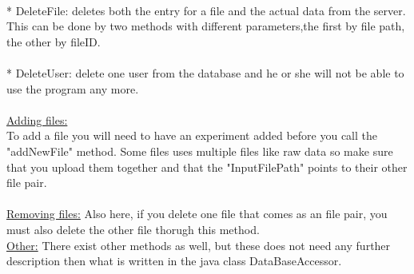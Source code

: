 \\
* DeleteFile: deletes both the entry for a file and the actual data from the server. This can be done by two methods with different parameters,the first by file path, the other by fileID.\\
\\
* DeleteUser: delete one user from the database and he or she will not be able to use the program any more.\\
\\
\underline{Adding files:}\\
To add a file you will need to have an experiment added before you call the "addNewFile" method. Some files uses multiple files like raw data so make sure that you upload them together and that the "InputFilePath" points to their other file pair.\\
\\
\underline{Removing files:} Also here, if you delete one file that comes as an file pair, you must also delete the other file thorugh this method.\\

\underline{Other:} There exist other methods as well, but these does not need any further description then what is written in the java class DataBaseAccessor.\\